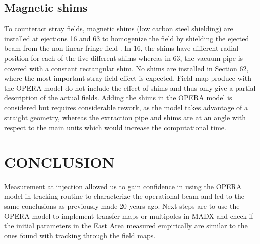 \documentclass[a4paper,
               biblatex,     %
               keeplastbox,   %
               ]{jacow}
\begin{document}
\subsection{Magnetic shims}

To counteract stray fields, magnetic shims (low carbon steel shielding) are installed at ejections 16 and 63 to homogenize the field by shielding the ejected beam from the non-linear fringe field \cite{zickler_influence_nodate}. In 16, the shims have different radial position for each of the five different shims whereas in 63, the vacuum pipe is covered with a constant rectangular shim. No shims are installed in Section 62, where the most important stray field effect is expected. Field map produce with the OPERA model do not include the effect of shims and thus only give a partial description of the actual fields. Adding the shims in the OPERA model is considered but requires considerable rework, as the model takes advantage of a straight geometry, whereas the extraction pipe and shims are at an angle with respect to the main units which would increase the computational time.


\section{CONCLUSION}
Measurement at injection allowed us to gain confidence in using the OPERA model in tracking routine to characterize the operational beam and led to the same conclusions as previously made 20 years ago. Next steps are to use the OPERA model to implement transfer maps or multipoles in MADX and check if the initial parameters in the East Area measured empirically are similar to the ones found with tracking through the field maps.

\printbibliography
\end{document}
